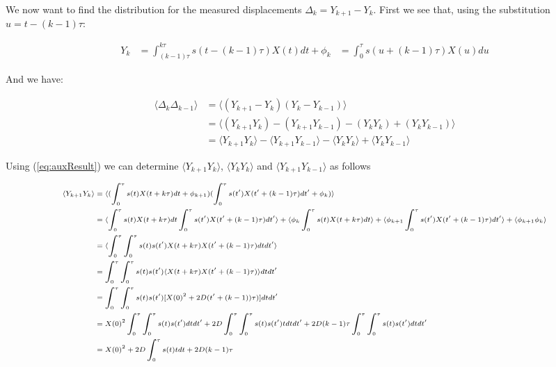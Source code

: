 \documentclass[ba]{imsart}\usepackage[]{graphicx}\usepackage[]{xcolor}
\numberwithin{equation}{section}
\theoremstyle{plain}
\begin{document}
\begin{supplement}
We now want to find the distribution for the measured displacements $\Delta_k=Y_{k+1}-Y_k$.
First we see that, using the substitution $u=t-(k-1)\tau$:

$$
\begin{aligned}
Y_k &= \int_{(k-1)\tau}^{k\tau} s(t-(k-1)\tau)X(t)dt + \phi_k
    &= \int_{0}^{\tau} s(u+(k-1)\tau)X(u)du
\end{aligned}
$$

And we have:

$$
\begin{aligned}
\langle \Delta_{k} \Delta_{k-1} \rangle &= \langle (Y_{k+1}-Y_{k})(Y_{k}-Y_{k-1}) \rangle \\
      &= \langle (Y_{k+1}Y_{k})-(Y_{k+1}Y_{k-1})-(Y_{k}Y_{k})+(Y_{k}Y_{k-1}) \rangle \\
      &= \langle Y_{k+1}Y_{k} \rangle - \langle Y_{k+1}Y_{k-1} \rangle - \langle Y_{k}Y_{k} \rangle + \langle Y_{k}Y_{k-1} \rangle
\end{aligned}
$$

Using (\ref{eq:auxResult}) we can determine $\langle Y_{k+1}Y_{k} \rangle$,
$\langle Y_{k}Y_{k} \rangle$ and $\langle Y_{k+1}Y_{k-1} \rangle$ as follows

\begin{equation} \label{eq:expectation1}
\scriptsize
\begin{aligned}
\langle Y_{k+1}Y_{k} \rangle &= \langle (\int_{0}^{\tau} s(t)X(t+k\tau)dt + \phi_{k+1}) (\int_{0}^{\tau} s(t')X(t'+(k-1)\tau)dt' + \phi_k) \rangle \\
 &= \langle \int_{0}^{\tau} s(t)X(t+k\tau)dt \int_{0}^{\tau} s(t')X(t'+(k-1)\tau)dt' \rangle + \langle \phi_k \int_{0}^{\tau} s(t)X(t+k\tau)dt  \rangle + \langle \phi_{k+1} \int_{0}^{\tau} s(t')X(t'+(k-1)\tau)dt' \rangle + \langle  \phi_{k+1}\phi_{k} \rangle \\
 &= \langle \int_{0}^{\tau} \int_{0}^{\tau} s(t) s(t') X(t+k\tau) X(t'+(k-1)\tau) dt dt' \rangle \\
 &= \int_{0}^{\tau} \int_{0}^{\tau} s(t) s(t') \langle X(t+k\tau) X(t'+(k-1)\tau) \rangle dt dt'  \\
 &= \int_{0}^{\tau} \int_{0}^{\tau} s(t) s(t')[ X(0)^2+2D (t'+(k-1))\tau )] dt dt' \\
 &=  X(0)^2 \int_{0}^{\tau} \int_{0}^{\tau} s(t) s(t') dt dt'+2D \int_{0}^{\tau} \int_{0}^{\tau} s(t) s(t') t dt dt'+ 2D (k-1)\tau \int_{0}^{\tau} \int_{0}^{\tau} s(t) s(t') dt dt' \\
 &=  X(0)^2 +2D\int_{0}^{\tau} s(t) t dt+ 2D (k-1)\tau
\end{aligned}
\end{equation}


\end{supplement}
\end{document}
